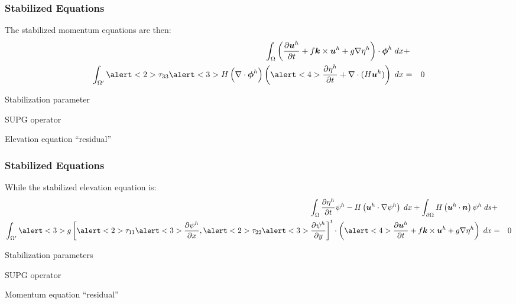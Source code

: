 \begin{frame}[t]
  \frametitle{Stabilized Equations}
  \begin{itemize}%
  \item{The stabilized momentum equations are then:
    \begin{eqnarray}
      \nonumber
      \int_{\Omega}
      \left(
      \frac{\partial \bv{u}^h}{\partial t} + f \bv{k}\times \bv{u}^h + g \nabla \eta^h
      \right) \cdot \bv{\phi}^h \;dx
      &+& \\
      \nonumber
      \int_{\Omega'}
      \alert<2>{\tau_{33}
	}
      \alert<3>{
      H \left(\nabla \cdot \bv{\phi}^h\right)
      }
      \left( \alert<4>{
	\frac{\partial \eta^h}{\partial t} +
	\nabla \cdot (H \bv{u}^h)
	}
      \right) \;dx
      &=& 0 
  \end{eqnarray}
    }
    
    {
      \item{Stabilization parameter}
    }
    {
      \item{SUPG operator}
    }

    {
      \item{Elevation equation ``residual''}
    }
  \end{itemize}
\end{frame}


\begin{frame}[t]
  \frametitle{Stabilized Equations}
  \begin{itemize}%
  \item{While the stabilized elevation equation is:
    \begin{eqnarray}
    \nonumber
    \int_{\Omega}
    \frac{\partial \eta^h}{\partial t}\psi^h -
    H \left( \bv{u}^h \cdot \nabla \psi^h \right)\;dx
    + \int_{\partial \Omega} H \left( \bv{u}^h \cdot \bv{n} \right) \psi^h \;ds &+& \\
    \nonumber
    \int_{\Omega'} \alert<3>{g}
    \left[\alert<2>{\tau_{11}}
      \alert<3>{\frac{\partial \psi^h}{\partial x}},
      \alert<2>{\tau_{22}}
      \alert<3>{\frac{\partial \psi^h}{\partial y}}
      \right]^t \cdot 
    \left(
      \alert<4>{\frac{\partial \bv{u}^h}{\partial t} +
      f \bv{k}\times \bv{u}^h + g \nabla \eta^h
      }
    \right)
    \;dx &=& 0
  \end{eqnarray}
    }
    
    {
      \item{Stabilization parameters}
    }
    {
      \item{SUPG operator}
    }

    {
      \item{Momentum equation ``residual''}
    }
  \end{itemize}
\end{frame}

